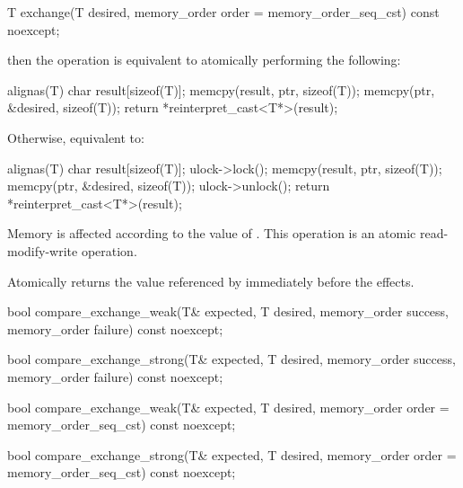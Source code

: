 \begin{itemdecl}
T exchange(T desired, memory_order order = memory_order_seq_cst) const noexcept;
\end{itemdecl}

\begin{itemdescr}
\pnum
{}
\begin{addedblock}
\effects {}
then the operation is equivalent to atomically performing the following:
\begin{codeblock}
  alignas(T) char result[sizeof(T)];
  memcpy(result, ptr, sizeof(T));
  memcpy(ptr, &desired, sizeof(T));
  return *reinterpret_cast<T*>(result);
\end{codeblock}
Otherwise, equivalent to:
\begin{codeblock}
  alignas(T) char result[sizeof(T)];
  ulock->lock();
  memcpy(result, ptr, sizeof(T));
  memcpy(ptr, &desired, sizeof(T));
  ulock->unlock();
  return *reinterpret_cast<T*>(result);
\end{codeblock}
\end{addedblock}
Memory is affected according to the value of .
This operation is an atomic read-modify-write operation.

\begin{removedblock}
\pnum
\returns Atomically returns the value referenced by 
immediately before the effects.
\end{removedblock}
\end{itemdescr}


\begin{itemdecl}
bool compare_exchange_weak(T& expected, T desired,
                           memory_order success, memory_order failure) const noexcept;

bool compare_exchange_strong(T& expected, T desired,
                             memory_order success, memory_order failure) const noexcept;

bool compare_exchange_weak(T& expected, T desired,
                           memory_order order = memory_order_seq_cst) const noexcept;

bool compare_exchange_strong(T& expected, T desired,
                             memory_order order = memory_order_seq_cst) const noexcept;
\end{itemdecl}

